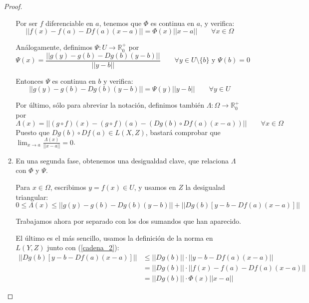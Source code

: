 \documentclass[a4paper, 12pt]{article}
\begin{document}
\begin{enumerate}[label=\textbf{\arabic*}.]
\begin{proof}
\begin{enumerate}[label=\textbf{(\alph*).}]
		Por ser \(f\) diferenciable en \(a\), tenemos que \(\Phi\) es continua en \(a\), y verifica:
		\begin{equation}\label{cadena_2}
			||f(x) - f(a) - Df(a)(x-a)|| = \Phi (x) ||x-a|| \qquad \forall x \in \Omega
		\end{equation}
		
		Análogamente, definimos \(\Psi : U \to \mathbb{R}_0^+\) por
		\begin{equation}\label{cadena_3}
			\Psi (x) = \frac{||g(y) - g(b) - Dg(b)(y-b)||}{||y-b||} \qquad \forall y \in U \setminus \{b\} \text{ y } \Psi(b) = 0
		\end{equation}
		
		Entonces \(\Psi\) es continua en \(b\) y verifica:
		\begin{equation}\label{cadena_4}
			||g(y)- g(b) - Dg(b)(y-b)|| = \Psi (y) ||y-b|| \qquad \forall y \in U
		\end{equation}
		
		Por último, sólo para abreviar la notación, definimos también \(\Lambda : \Omega \to \mathbb{R}_0^+\) por
		\[
			\Lambda(x) = ||(g \circ f)(x) - (g \circ f)(a) - (Dg(b) \circ Df(a)(x-a))|| \qquad \forall x \in \Omega
		\]
		Puesto que \(Dg(b) \circ Df(a) \in L(X,Z)\), bastará comprobar que \(\lim_{x \to a} \frac{\Lambda (x)}{||x-a||} = 0\).
		
		\item En una segunda fase, obtenemos una desigualdad clave, que relaciona \(\Lambda\) con \(\Phi\) y \(\Psi\).
		
		Para \(x \in \Omega\), escribimos \(y = f(x) \in U\), y usamos en \(Z\) la desigualad triangular:
		\begin{equation}\label{cadena_5}
			0 \leq \Lambda (x) \leq || g(y) - g(b) - Dg(b)(y-b)|| + ||Dg(b) [ y - b - Df(a)(x-a)] || 
		\end{equation}
		
		Trabajamos ahora por separado con los dos sumandos que han aparecido.
		
		El último es el más sencillo, usamos la definición de la norma en \(L(Y,Z)\) junto con (\ref{cadena_2}):
		\begin{equation}\label{cadena_6}
		\begin{array}{ll}
		||Dg(b)[y-b-Df(a)(x-a)]|| & \leq ||Dg(b)|| \cdot ||y -b - Df(a)(x-a)|| \\
		& = ||Dg(b)|| \cdot ||f(x) - f(a) - Df(a)(x-a)|| \\
		& = ||Dg(b)|| \cdot \Phi (x) ||x-a||
		\end{array}
		\end{equation}
		

\end{enumerate}
\end{proof}
\end{enumerate}
\end{document}

